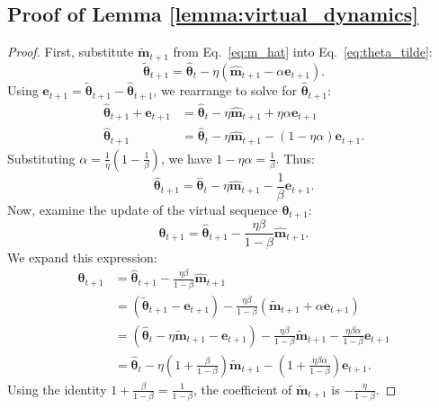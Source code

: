 \documentclass[11pt, a4paper, onecolumn, copyright, goog]{google}
\newcommand{\vect}[1]{\mathbf{#1}}
\newcommand{\vtheta}{\boldsymbol{\theta}}
\newcommand{\vm}{\vect{m}}
\newcommand{\ve}{\vect{e}}
\theoremstyle{plain}
\theoremstyle{definition}
\theoremstyle{remark}
\begin{document}
\subsection{Proof of Lemma \ref{lemma:virtual_dynamics}}
\label{proof:lemma_virtual_dynamics}
\begin{proof}
First, substitute $\tilde{\vm}_{t+1}$ from Eq.~\eqref{eq:m_hat} into Eq.~\eqref{eq:theta_tilde}:
\begin{equation}
    \tilde{\vtheta}_{t+1} = \hat{\vtheta}_t - \eta (\hat{\vm}_{t+1} - \alpha \ve_{t+1}).
\end{equation}
Using $\ve_{t+1} = \tilde{\vtheta}_{t+1} - \hat{\vtheta}_{t+1}$, we rearrange to solve for $\hat{\vtheta}_{t+1}$:
\begin{align}
    \hat{\vtheta}_{t+1} + \ve_{t+1} &= \hat{\vtheta}_t - \eta \hat{\vm}_{t+1} + \eta \alpha \ve_{t+1} \nonumber \\
    \hat{\vtheta}_{t+1} &= \hat{\vtheta}_t - \eta \hat{\vm}_{t+1} - (1 - \eta \alpha) \ve_{t+1}.
\end{align}
Substituting $\alpha = \frac{1}{\eta}(1 - \frac{1}{\beta})$, we have $1 - \eta \alpha = \frac{1}{\beta}$. Thus:
\begin{equation} \label{eq:theta_hat_update_app}
    \hat{\vtheta}_{t+1} = \hat{\vtheta}_t - \eta \hat{\vm}_{t+1} - \frac{1}{\beta} \ve_{t+1}.
\end{equation}
Now, examine the update of the virtual sequence $\vtheta_{t+1}$:
\begin{equation}
    \vtheta_{t+1} = \hat{\vtheta}_{t+1} - \frac{\eta \beta}{1-\beta} \hat{\vm}_{t+1}.
\end{equation}
We expand this expression:
\begin{align}
    \vtheta_{t+1} &= \hat{\vtheta}_{t+1} - \frac{\eta \beta}{1-\beta} \hat{\vm}_{t+1} \nonumber \\
    &= (\tilde{\vtheta}_{t+1} - \ve_{t+1}) - \frac{\eta \beta}{1-\beta} (\tilde{\vm}_{t+1} + \alpha \ve_{t+1}) \nonumber \\
    &= (\hat{\vtheta}_t - \eta \tilde{\vm}_{t+1} - \ve_{t+1}) - \frac{\eta \beta}{1-\beta} \tilde{\vm}_{t+1} - \frac{\eta \beta \alpha}{1-\beta} \ve_{t+1} \nonumber \\
    &= \hat{\vtheta}_t - \eta \left( 1 + \frac{\beta}{1-\beta} \right) \tilde{\vm}_{t+1} - \left( 1 + \frac{\eta \beta \alpha}{1-\beta} \right) \ve_{t+1}.
\end{align}
Using the identity $1 + \frac{\beta}{1-\beta} = \frac{1}{1-\beta}$, the coefficient of $\tilde{\vm}_{t+1}$ is $-\frac{\eta}{1-\beta}$.

\end{proof}
\end{document}
